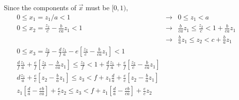 \documentclass[11pt]{article}
\begin{document}
Since the components of $\vec x$ must be $[0,1)$,
\begin{eqnarray*}
0\leq x_1=z_1/a <
1&\rightarrow& \boxed{0\leq z_1<a}\\
0\leq x_2=\frac{z_2}{c}-\frac{b}{ca}z_1<1&\rightarrow&
\frac{b}{ca}z_1\leq \frac{z_2}{c} < 1+\frac{b}{ca}z_1\\ &\rightarrow&
\boxed{\frac{b}{a}z_1\leq z_2 < c+\frac{b}{a}z_1} \\
0\leq x_3 =
\frac{z_3}{f}-\frac{d}{f}\frac{z_1}{a}-e[\frac{z_2}{c}-\frac{b}{ca}z_1]<1&&\\
\frac{d}{f}\frac{z_1}{a}+\frac{e}{f}[\frac{z_2}{c}-\frac{b}{ca}z_1]\leq
\frac{z_3}{f}<
1+\frac{d}{f}\frac{z_1}{a}+\frac{e}{f}[\frac{z_2}{c}-\frac{b}{ca}z_1]&&\\
d\frac{z_1}{a}+\frac{e}{c}[z_2-\frac{b}{a}z_1]\leq
z_3<
f+z_1\frac{d}{a}+\frac{e}{c}[z_2-\frac{b}{a}z_1]&&\\
%
\boxed{z_1[\frac{d}{a}-\frac{eb}{ca}]+\frac{e}{c}z_2\leq
z_3<
f+z_1[\frac{d}{a}-\frac{eb}{ca}]+\frac{e}{c}z_2}&&\\
\end{eqnarray*}
\end{document}
